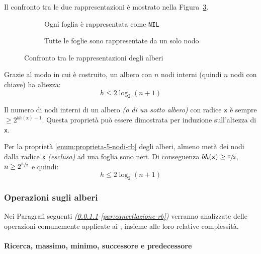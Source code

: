 \documentclass[italian, 10pt]{article}
\begin{document}
\bigskip
Il confronto tra le due rappresentazioni è mostrato nella Figura~\ref{fig:confronto-tra-le-rappresentazioni-degli-alberi-RB}.

\begin{figure}[htbp]
  \bigskip
  \centering
  \begin{subfigure}[b]{.495\textwidth}
    \centering
    \caption{Ogni foglia è rappresentata come \texttt{NIL}}
    \bigskip
    \label{fig:foglia-rappresentata-come-NIL}
  \end{subfigure}
  \begin{subfigure}[b]{.495\textwidth}
    \centering
    \caption{Tutte le foglie sono rappresentate da un solo nodo}
    \bigskip
    \label{fig:foglie-rappresentate-da-un-solo-nodo}
  \end{subfigure}
  \caption{Confronto tra le rappresentazioni degli alberi \RB}
  \label{fig:confronto-tra-le-rappresentazioni-degli-alberi-RB}
  \bigskip
\end{figure}

\bigskip
Grazie al modo in cui è costruito, un albero \RB con \(n\) nodi interni (quindi \(n\) nodi con chiave) ha altezza:
\[h \leq 2 \log_2{(n+1)}\]

Il numero di nodi interni di un albero \textit{(o di un sotto albero)} con radice \texttt{x} è sempre \(\geq 2^{bh(\texttt{x})-1}\).
Questa proprietà può essere dimostrata per induzione sull'altezza di \texttt{x}.

Per la proprietà \ref{enum:proprieta-5-nodi-rb} degli alberi, almeno metà dei nodi dalla radice \texttt{x} \textit{(esclusa)} ad una foglia sono neri.
Di conseguenza \(bh(\texttt{x}) \geq \sfrac{x}{2}\), \(n \geq 2^{\sfrac{h}{2}}\) e quindi:
\[ h \leq 2 \log_2{(n+1)} \]

\subsubsection{Operazioni sugli alberi \RB}

Nei Paragrafi seguenti \textit{(\ref{par:operazioni-rb-analoghe-a-bst}-\ref{par:cancellazione-rb})} verranno analizzate delle operazioni comunemente applicate ai \BST, insieme alle loro relative complessità.

\paragraph{Ricerca, massimo, minimo, successore e predecessore}
\label{par:operazioni-rb-analoghe-a-bst}
\end{document}

